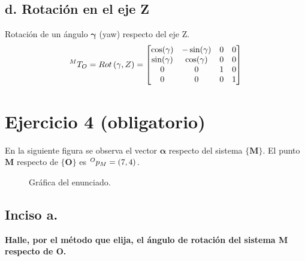 \documentclass[a4paper,12pt]{article}
\begin{document}
\subsection{d. Rotación en el eje Z}

Rotación de un ángulo $\mathbf{\gamma}$ (yaw) respecto del eje Z.
\begin{equation*}
    \prescript{M}{}{T_O} = Rot\left(\gamma, Z\right) = 
    \begin{bmatrix}
        \cos(\gamma) & -\sin(\gamma) & 0 & 0 \\
        \sin(\gamma) & \cos(\gamma)  & 0 & 0 \\
        0            & 0             & 1 & 0 \\
        0            & 0             & 0 & 1
    \end{bmatrix}
\end{equation*}

\section{Ejercicio 4 (obligatorio)}
En la siguiente figura se observa el vector $\mathbf{\alpha}$ respecto del sistema $\mathbf{\{M\}}$.
El punto $\mathbf{M}$ respecto de $\mathbf{\{O\}}$ es $\prescript{O}{}{p_M} = \left(7,4\right) $.

\begin{figure}[H]
    \centering
    \begin{adjustbox}{scale = 0.85, max width=\columnwidth}
    \end{adjustbox}
    \caption{Gráfica del enunciado.}
\end{figure}

\subsection{Inciso a.}
\textbf{Halle, por el método que elija, el ángulo de rotación del sistema {M} respecto de {O}.}
\vspace{0.5 cm}
\end{document}
